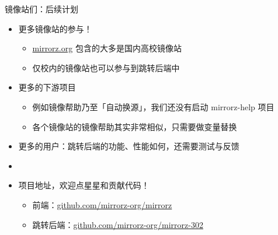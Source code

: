 \documentclass{ctexbeamer}
\begin{document}
\begin{frame}{镜像站们：后续计划}
  \begin{itemize}
    \item 更多镜像站的参与！\begin{itemize}
      \item \url{mirrorz.org} 包含的大多是国内高校镜像站
      \item 仅校内的镜像站也可以参与到跳转后端中
    \end{itemize}
    \item 更多的下游项目\begin{itemize}
      \item 例如镜像帮助乃至「自动换源」，我们还没有启动 mirrorz-help 项目
      \item 各个镜像站的镜像帮助其实非常相似，只需要做变量替换
    \end{itemize}
    \item 更多的用户：跳转后端的功能、性能如何，还需要测试与反馈
    \item[]\ 
    \item 项目地址，欢迎点星星和贡献代码！\begin{itemize}
      \item 前端：\url{github.com/mirrorz-org/mirrorz}
      \item 跳转后端：\url{github.com/mirrorz-org/mirrorz-302}
    \end{itemize}
  \end{itemize}
\end{frame}
\end{document}
